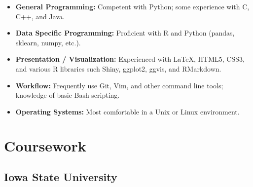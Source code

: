 \documentclass[11pt,a4paper,sans]{moderncv}        %
\begin{document}
\vspace{6pt}

\begin{itemize}
  \item \textbf{General Programming:}  Competent with Python; some experience with C, C++, and Java. 

\vspace{6pt}

\item \textbf{Data Specific Programming:} Proficient with R and Python (pandas, sklearn, numpy, etc.).

\vspace{6pt}

\item \textbf{Presentation / Visualization:} Experienced with \LaTeX, HTML5, CSS3, and various R libraries such Shiny, ggplot2, ggvis, and RMarkdown.

\vspace{6pt}

\item \textbf{Workflow:} Frequently use Git, Vim, and other command line tools; knowledge of basic Bash scripting.

\vspace{6pt}

\item \textbf{Operating Systems:} Most comfortable in a Unix or Linux environment.

\end{itemize}


\section{Coursework}

\vspace{6pt}

\subsection{Iowa State University}
\end{document}

